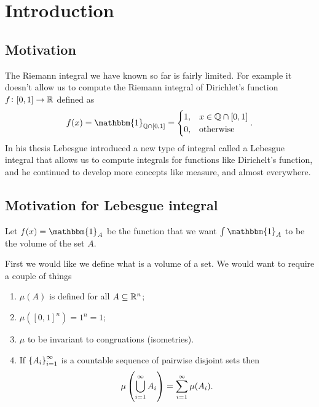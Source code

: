 \documentclass[11pt,a4paper]{article}
\begin{document}
\maketitle


\newpage
\tableofcontents
\newpage

\section{Introduction}

\subsection{Motivation}
The Riemann integral we have known so far is fairly limited.
For example it doesn't allow us to compute the Riemann integral
of Dirichlet's function $f \colon [0,1] \to \mathbb{R}$ defined as
\[
  f(x) = \mathbbm{1}_{\Q \cap [0,1]} =
  \begin{cases}
    1, &x \in \Q \cap [0,1] \\
    0, &\text{otherwise}
  \end{cases}.
\]
In his thesis Lebesgue introduced a new type of integral called
a Lebesgue integral that allows us to compute integrals for functions
like Dirichelt's function, and he continued to develop more concepts
like measure, and almost everywhere.

\subsection{Motivation for Lebesgue integral}
Let $f(x) = \mathbbm{1}_A$ be the function that 
we want $\int \mathbbm{1}_A$ to be the volume of the set $A$.

First we would like we define what is a volume of a set.
We would want to require a couple of things
\begin{enumerate}
  \item[(1)] $\mu(A)$ is defined for all $A \subseteq \mathbb{R}^n$;
  \item[(2)] $\mu([0,1]^n) = 1^n = 1$;
  \item[(3)] $\mu$ to be invariant to congruations (isometries).
  \item[(4)] If $\left\{A_i\right\}_{i=1}^{\infty}$ is a countable sequence
    of pairwise disjoint sets then
    \[
      \mu\del{\bigcup_{i=1}^{\infty} A_i} = \sum_{i=1}^{\infty} \mu(A_i).
    \]
\end{enumerate}
\end{document}

